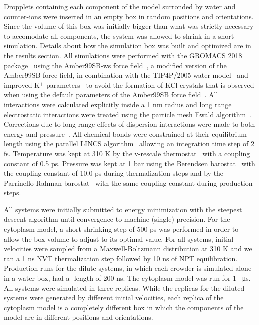 \documentclass[journal=jpcisd8,manuscript=article]{achemso}
\begin{document}
Dropplets containing each component of the model surronded by water and counter-ions were inserted in an empty box in random positions and orientations. Since the volume of this box was initially bigger than what was strictly necessary to accomodate all components, the system was allowed to shrink in a short simulation. Details about how the simulation box was built and optimized are in the results section. All
simulations were performed with the GROMACS 2018
package~\cite{Abraham2015a,Pronk2013a} using the Amber99SB-ws force
field~\cite{Best2014a}, a modified version of the Amber99SB force
field, in combination with the TIP4P/2005 water
model~\cite{Abascal2005b} and improved K$^+$ parameters~\cite{Dang1995a} to avoid the formation of KCl crystals that is observed when using the default parameters of the Amber99SB force field~\cite{Auffinger2007a}. All interactions were calculated explicitly
inside a 1 nm radius and long range electrostatic interactions were
treated using the particle mesh Ewald
algorithm~\cite{Essmann1995a}. Corrections due to long range effects
of dispersion interactions were made to both energy and
pressure~\cite{Allen1987a}. All chemical bonds were constrained at
their equilibrium length using the parallel LINCS
algorithm~\cite{Hess1997a,Hess2008b} allowing an integration time step
of 2 fs. Temperature was kept at 310 K by the v-rescale
thermostat~\cite{Bussi2007a} with a coupling constant of 0.5
ps. Pressure was kept at 1 bar using the Berendsen
barostat~\cite{Berendsen1984a} with the coupling constant of 10.0 ps
during thermalization steps and by the Parrinello-Rahman
barostat~\cite{Parrinello1981a} with the same coupling constant during
production steps.

All systems were initially submitted to energy minimization with the
steepest descent algorithm until convergence to machine (single)
precision. For the cytoplasm model, a short shrinking step of 500 ps
was performed in order to allow the box volume to adjust to its
optimal value. For all systems, initial velocities were sampled from a
Maxwell-Boltzmann distribution at 310 K and we ran a 1 ns NVT
thermalization step followed by 10 ns of NPT equilibration. Production
runs for the dilute systems, in which each crowder is simulated alone
in a water box, had a- length of 200 ns. The cytoplasm model was run
for 1 \SI{}{\micro\second}. All systems were simulated in three
replicas. While the replicas for the diluted systems were generated by
different initial velocities, each replica of the cytoplasm model is a
completely different box in which the components of the model are in
different positions and orientations.
\end{document}
